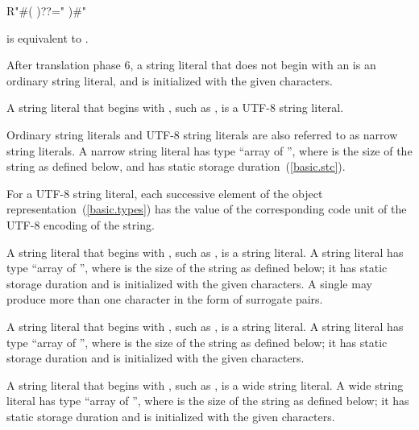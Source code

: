 \begin{codeblock}
R"#(
)??="
)#"
\end{codeblock}

is equivalent to . \exitexample

\pnum
{}%
%
After translation phase 6, a string literal that does not begin with an  is an ordinary string literal, and is initialized with the given characters.

\pnum
A string literal that begins with , such as , is a UTF-8 string literal.

\pnum
Ordinary string literals and UTF-8 string literals are
also referred to as narrow
string literals. A narrow string literal has type
%
``array of  '', where  is the size of
the string as defined below, and has static storage
duration~(\ref{basic.stc}).

\pnum
For a UTF-8 string literal, each successive element of the object
representation~(\ref{basic.types}) has the value of the corresponding
code unit of the UTF-8 encoding of the string.

\pnum
{}%
A string literal that begins with , such as , is
a  string literal. A  string literal has
type ``array of  '', where  is the
size of the string as defined below; it has static storage duration and
is initialized with the given characters. A single  may
produce more than one  character in the form of
surrogate pairs.

\pnum
{}%
A string literal that begins with , such as , is
a  string literal. A  string literal has
type ``array of  '', where  is the
size of the string as defined below; it has static storage duration and
is initialized with the given characters.

\pnum
{}%
A string literal that begins with
,
such as ,
is a wide string literal.
%
%
%
%
A wide string literal has type ``array of  '', where  is the size of the string as defined below; it
has static storage duration and is initialized with the given
characters.

